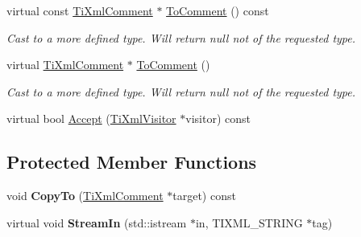 \begin{DoxyCompactItemize}
\item 
\hypertarget{class_ti_xml_comment_a00fb4215c20a2399ea05ac9b9e7e68a0}{
virtual const \hyperlink{class_ti_xml_comment}{TiXmlComment} $\ast$ \hyperlink{class_ti_xml_comment_a00fb4215c20a2399ea05ac9b9e7e68a0}{ToComment} () const }
\label{class_ti_xml_comment_a00fb4215c20a2399ea05ac9b9e7e68a0}

\begin{DoxyCompactList}\small\item\em Cast to a more defined type. Will return null not of the requested type. \item\end{DoxyCompactList}\item 
\hypertarget{class_ti_xml_comment_acc7c7e07e13c23f17797d642981511df}{
virtual \hyperlink{class_ti_xml_comment}{TiXmlComment} $\ast$ \hyperlink{class_ti_xml_comment_acc7c7e07e13c23f17797d642981511df}{ToComment} ()}
\label{class_ti_xml_comment_acc7c7e07e13c23f17797d642981511df}

\begin{DoxyCompactList}\small\item\em Cast to a more defined type. Will return null not of the requested type. \item\end{DoxyCompactList}\item 
virtual bool \hyperlink{class_ti_xml_comment_af3ac1b99fbbe9ea4fb6e14146156e43e}{Accept} (\hyperlink{class_ti_xml_visitor}{TiXmlVisitor} $\ast$visitor) const 
\end{DoxyCompactItemize}
\subsection*{Protected Member Functions}
\begin{DoxyCompactItemize}
\item 
\hypertarget{class_ti_xml_comment_a3175b2f27628f4fb7a043897930cd934}{
void {\bfseries CopyTo} (\hyperlink{class_ti_xml_comment}{TiXmlComment} $\ast$target) const }
\label{class_ti_xml_comment_a3175b2f27628f4fb7a043897930cd934}

\item 
\hypertarget{class_ti_xml_comment_ad69c1024082f716462b6fd4b94488320}{
virtual void {\bfseries StreamIn} (std::istream $\ast$in, TIXML\_\-STRING $\ast$tag)}
\label{class_ti_xml_comment_ad69c1024082f716462b6fd4b94488320}

\end{DoxyCompactItemize}


